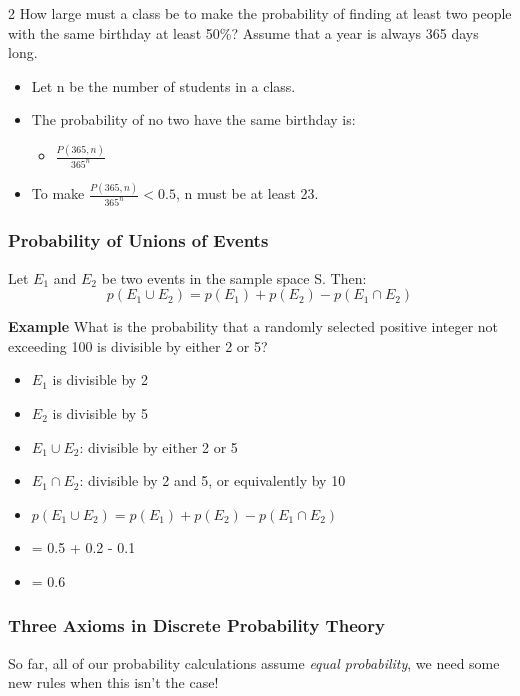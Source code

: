 \documentclass[12pt, letterpaper]{article}
\newcommand{\exheader}[1][ex]{{\tiny{#1}\normalsize}}
\begin{document}
\exheader[2] How large must a class be to make the probability of finding at least two people with the same birthday at least 50\%? Assume that a year is always 365 days long.
\begin{itemize}[leftmargin=*,  label={}]
	\item Let n be the number of students in a class.
	\item The probability of no two have the same birthday is:
	\begin{itemize}
		\item $\frac{P(365,n)}{365^n}$
	\end{itemize}
	\item To make $\frac{P(365,n)}{365^n} < 0.5$, n must be at least 23.
\end{itemize}

\pagebreak

\subsubsection*{Probability of Unions of Events} 
Let $E_1$ and $E_2$ be two events in the sample space S. Then: \[p(E_1 \cup E_2) = p(E_1) + p(E_2) - p(E_1 \cap E_2)\]

\textbf{Example}
What is the probability that a randomly selected positive integer
not exceeding 100 is divisible by either 2 or 5?
\begin{itemize}[leftmargin=*,  label={}]
	\item $E_1$ is divisible by 2
	\item $E_2$ is divisible by 5
	\item $E _1 \cup E_2$: divisible by either 2 or 5
	\item $E_1 \cap E_2$: divisible by 2 and 5, or equivalently by 10
	\item $p(E_1 \cup E_2) = p(E_1) + p(E_2) - p(E_1 \cap E_2)$
	\item \quad \quad \quad \quad \quad = 0.5 + 0.2 - 0.1
	\item \quad \quad \quad \quad \quad = 0.6
\end{itemize}

\pagebreak

\subsubsection*{Three Axioms in Discrete Probability Theory}

So far, all of our probability calculations assume \emph{equal probability}, we need some new rules when this isn't the case!
\end{document}
